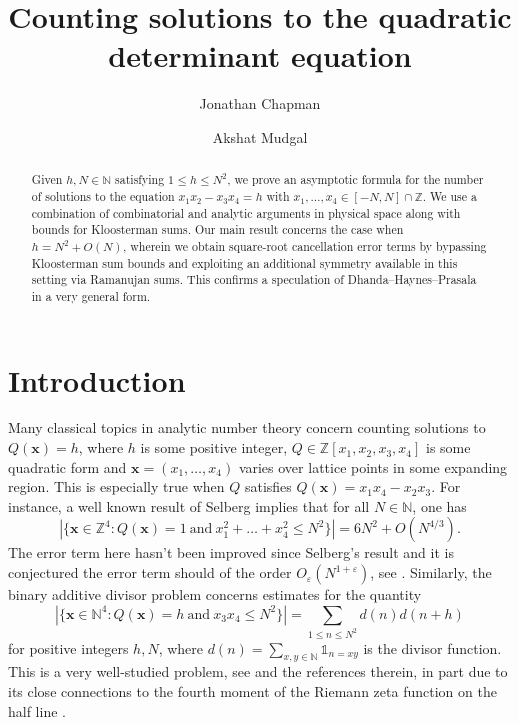 \documentclass[12pt,reqno]{amsart}
\title{Counting solutions to the quadratic determinant equation}
\author{Jonathan Chapman \and Akshat Mudgal}
\theoremstyle{definition}
\theoremstyle{remark}
\numberwithin{equation}{section}
\renewcommand{\leq}{\leqslant}
\def\eps{\varepsilon}
\newcommand\1{\mathds{1}}
\renewcommand\vec{\bm}
\begin{document}
\begin{abstract}
Given $h, N \in \mathbb{N}$ satisfying $1 \leqslant h \leqslant N^2$, we prove an asymptotic formula for the number of solutions to the equation $x_1 x_2 - x_3 x_4 = h$ with $x_1, \ldots, x_4 \in [-N,N] \cap \mathbb{Z}$. We use a combination of combinatorial and analytic arguments in physical space along with bounds for Kloosterman sums. Our main result concerns the case when $h = N^2 + O(N)$, wherein we obtain square-root cancellation error terms by bypassing Kloosterman sum bounds and exploiting an additional symmetry available in this setting via Ramanujan sums. This confirms a speculation of Dhanda--Haynes--Prasala in a very general form.
\end{abstract}

\maketitle

\section{Introduction}


Many classical topics in analytic number theory concern counting solutions to $Q(\vec{x}) = h$, where $h$ is some positive integer, $Q \in \mathbb{Z}[x_1, x_2, x_3, x_4]$ is some quadratic form and $\vec{x} = (x_1, \dots, x_4)$ varies over lattice points in some expanding region. This is especially true when $Q$ satisfies $Q(\vec{x}) = x_1 x_4 - x_2 x_3$. For instance, a well known result of Selberg implies that for all $N \in \mathbb{N}$, one has
\begin{equation} \label{eqn1.1}
|\{ \vec{x} \in \mathbb{Z}^4:   Q(\vec{x}) = 1 \ \text{and}  \ x_1^2 + \dots + x_4^2 \leq N^2\}| = 6N^2 + O(N^{4/3}). 
\end{equation}
The error term here hasn't been improved since Selberg's result and it is conjectured the error term should of the order $O_{\eps}(N^{1 + \eps})$, see \cite{Iw2002}. Similarly,  the binary additive divisor problem concerns estimates for the quantity
\begin{equation} \label{eqn1.2}
|\{ \vec{x} \in \mathbb{N}^4 : Q(\vec{x}) = h \ \text{and}  \ x_3 x_4 \leq N^2  \}| = \sum_{1 \leq n \leq N^2} d(n) d(n+h)
\end{equation}
for positive integers $h, N$, where $d(n) = \sum_{x,y \in \mathbb{N}}\1_{n = xy}$ is the divisor function. This is a very well-studied problem, see \cite{DI1982, Meu2001, Mo1994} and the references therein, in part due to its close connections to the fourth moment of the Riemann zeta function on the half line \cite{HB1979}. 
\end{document}
